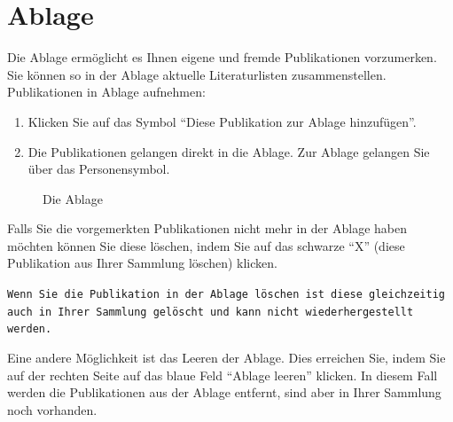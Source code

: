 \section{Ablage}
Die Ablage ermöglicht es Ihnen eigene und fremde Publikationen vorzumerken. Sie können so in der Ablage aktuelle Literaturlisten zusammenstellen.
\newline
Publikationen in Ablage aufnehmen: %
\begin{enumerate}
    \item Klicken Sie auf das Symbol \enquote{Diese Publikation zur Ablage hinzufügen}.
    \item Die Publikationen gelangen direkt in die Ablage. Zur Ablage gelangen Sie über das Personensymbol.
\end{enumerate}
\begin{figure}[h!]
 \centering
 \caption{Die Ablage}
 \label{figure023}
\end{figure} 
Falls Sie die vorgemerkten Publikationen nicht mehr in der Ablage haben möchten können Sie diese löschen, indem Sie auf das schwarze \enquote{X} (diese Publikation aus Ihrer Sammlung löschen) klicken.\newline
\begin{mdframed}[style=mdfexample1,frametitle={\texttt{ACHTUNG}},backgroundcolor=gray!40]\texttt{Wenn Sie die Publikation in der Ablage löschen ist diese gleichzeitig auch in Ihrer Sammlung gelöscht und kann nicht wiederhergestellt werden.}
\end{mdframed}

Eine andere Möglichkeit ist das Leeren der Ablage. Dies erreichen Sie, indem Sie auf der rechten Seite auf das blaue Feld \enquote{Ablage leeren} klicken. In diesem Fall werden die Publikationen aus der Ablage entfernt, sind aber in Ihrer Sammlung noch vorhanden.
